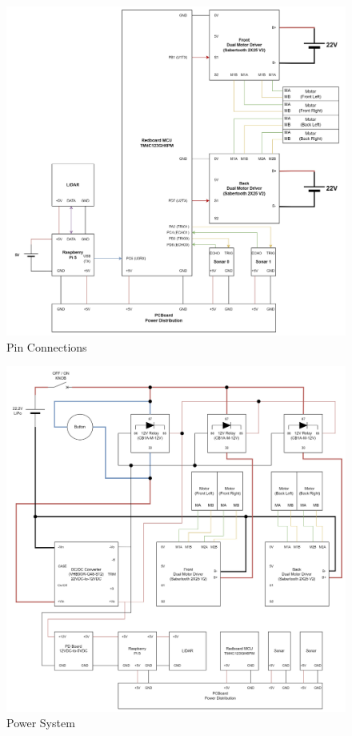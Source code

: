 \begin{figure}[h!]
	\centering
 	\includegraphics[width=1.00\textwidth]{images/circuits/3_pin_connections.jpg}
 \caption{Pin Connections}
 \label{fig:Pin Connections}
\end{figure}

\begin{figure}[h!]
	\centering
 	\includegraphics[width=1.00\textwidth]{images/circuits/4_power_system.jpg}
 \caption{Power System}
 \label{fig:Power System}
\end{figure}
